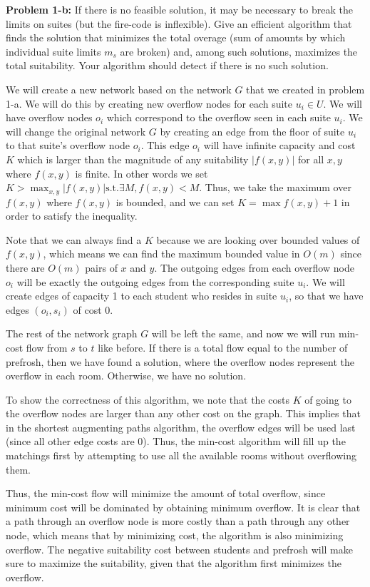 \documentclass[psamsfonts]{amsart}
\newenvironment{sol}{\vspace{0.25cm}{\large \bfseries Solution:}}{\qedsymbol}
\newenvironment{prob}[1]{\begin{framed}{\large \bfseries Problem #1:}}{\end{framed}}
\begin{document}
\begin{prob}{1-b}
If there is no feasible solution, it may be necessary to break the limits on suites (but the fire-code is inflexible). Give an efficient algorithm that finds the solution that minimizes the total overage (sum of amounts by which individual suite limits $m_s$ are broken) and, among such solutions, maximizes the total suitability. Your algorithm should detect if there is no such solution.
\end{prob}
\begin{sol}
We will create a new network based on the network $G$ that we created in problem 1-a. We will do this by creating new overflow nodes for each suite $u_i \in U$. We will have overflow nodes $o_i$ which correspond to the overflow seen in each suite $u_i$. We will change the original network $G$ by creating an edge from the floor of suite $u_i$ to that suite's overflow node $o_i$. This edge $o_i$ will have infinite capacity and cost $K$ which is larger than the magnitude of any suitability $|f(x,y)|$ for all $x,y$ where $f(x,y)$ is finite. In other words we set $K > \max_{x,y} |f(x,y)| \text{s.t.} \exists M, f(x,y) < M$. Thus, we take the maximum over $f(x,y)$ where $f(x,y)$ is bounded, and we can set $K = \max f(x,y) + 1$ in order to satisfy the inequality.

Note that we can always find a $K$ because we are looking over bounded values of $f(x,y)$, which means we can find the maximum bounded value in $O(m)$ since there are $O(m)$ pairs of $x$ and $y$. The outgoing edges from each overflow node $o_i$ will be exactly the outgoing edges from the corresponding suite $u_i$. We will create edges of capacity 1 to each student who resides in suite $u_i$, so that we have edges $(o_i, s_i)$ of cost 0.

The rest of the network graph $G$ will be left the same, and now we will run min-cost flow from $s$ to $t$ like before. If there is a total flow equal to the number of prefrosh, then we have found a solution, where the overflow nodes represent the overflow in each room. Otherwise, we have no solution.

To show the correctness of this algorithm, we note that the costs $K$ of going to the overflow nodes are larger than any other cost on the graph. This implies that in the shortest augmenting paths algorithm, the overflow edges will be used last (since all other edge costs are 0). Thus, the min-cost algorithm will fill up the matchings first by attempting to use all the available rooms without overflowing them. 

Thus, the min-cost flow will minimize the amount of total overflow, since minimum cost will be dominated by obtaining minimum overflow. It is clear that a path through an overflow node is more costly than a path through any other node, which means that by minimizing cost, the algorithm is also minimizing overflow. The negative suitability cost between students and prefrosh will make sure to maximize the suitability, given that the algorithm first minimizes the overflow. 
\end{sol}
\end{document}
